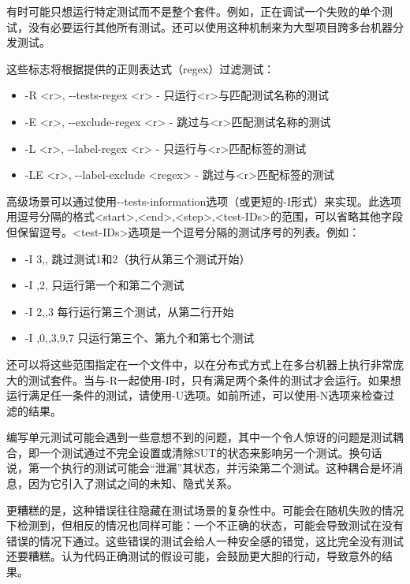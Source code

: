 有时可能只想运行特定测试而不是整个套件。例如，正在调试一个失败的单个测试，没有必要运行其他所有测试。还可以使用这种机制来为大型项目跨多台机器分发测试。

这些标志将根据提供的正则表达式（regex）过滤测试：

\begin{itemize}
\item
-R <r>, -{}-tests-regex <r> - 只运行<r>与匹配测试名称的测试

\item
-E <r>, -{}-exclude-regex <r> - 跳过与<r>匹配测试名称的测试

\item
-L <r>, -{}-label-regex <r> - 只运行与<r>匹配标签的测试

\item
 -LE <r>, -{}-label-exclude <regex> - 跳过与<r>匹配标签的测试
\end{itemize}

高级场景可以通过使用-{}-tests-information选项（或更短的-I形式）来实现。此选项用逗号分隔的格式<start>,<end>,<step>,<test-IDs>的范围，可以省略其他字段但保留逗号。<test-IDs>选项是一个逗号分隔的测试序号的列表。例如：

\begin{itemize}
\item
-I 3,, 跳过测试1和2（执行从第三个测试开始）

\item
-I ,2, 只运行第一个和第二个测试

\item
-I 2,,3 每行运行第三个测试，从第二行开始

\item
-I ,0,,3,9,7 只运行第三个、第九个和第七个测试
\end{itemize}

还可以将这些范围指定在一个文件中，以在分布式方式上在多台机器上执行非常庞大的测试套件。当与-R一起使用-I时，只有满足两个条件的测试才会运行。如果想运行满足任一条件的测试，请使用-U选项。如前所述，可以使用-N选项来检查过滤的结果。


编写单元测试可能会遇到一些意想不到的问题，其中一个令人惊讶的问题是测试耦合，即一个测试通过不完全设置或清除SUT的状态来影响另一个测试。换句话说，第一个执行的测试可能会“泄漏”其状态，并污染第二个测试。这种耦合是坏消息，因为它引入了测试之间的未知、隐式关系。

更糟糕的是，这种错误往往隐藏在测试场景的复杂性中。可能会在随机失败的情况下检测到，但相反的情况也同样可能：一个不正确的状态，可能会导致测试在没有错误的情况下通过。这些错误的测试会给人一种安全感的错觉，这比完全没有测试还要糟糕。认为代码正确测试的假设可能，会鼓励更大胆的行动，导致意外的结果。

